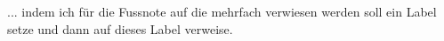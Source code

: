 
... indem ich für die Fussnote auf die mehrfach verwiesen werden soll ein Label setze und dann auf dieses Label verweise.
